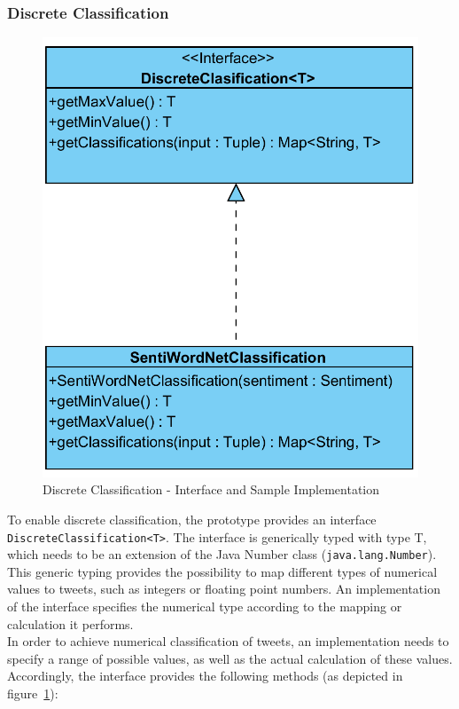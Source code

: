 \documentclass[a4paper]{article}
\begin{document}
\subsubsection{Discrete Classification}\label{section_discrete}
\begin{figure}[h!]
	\centering
	\includegraphics{images/uml_discrete.png}
	\caption{Discrete Classification - Interface and Sample Implementation}
	\label{uml_discrete}
\end{figure}
To enable discrete classification, the prototype provides an interface \texttt{DiscreteClassification<T>}. The interface is generically typed with type T, which needs to be an extension of the Java Number class (\texttt{java.lang.Number}). This generic typing provides the possibility to map different types of numerical values to tweets, such as integers or floating point numbers. An implementation of the interface specifies the numerical type according to the mapping or calculation it performs.\\
In order to achieve numerical classification of tweets, an implementation needs to specify a range of possible values, as well as the actual calculation of these values. Accordingly, the interface provides the following methods (as depicted in figure~\ref{uml_discrete}):
\end{document}
